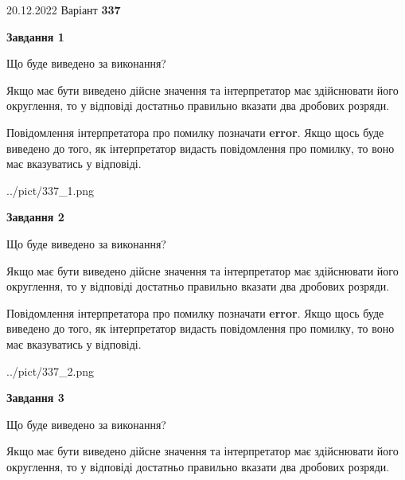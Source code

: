 \documentclass[12pt, ukrainian]{article}
\begin{document}
{20.12.2022 Варіант \No \textbf { 337 }\par}
{
\begin {Large}

{\begin {center}\textbf{Завдання 1}\end {center}}\par
Що буде виведено за виконання? \par

Якщо має бути виведено дійсне значення та інтерпретатор має здійснювати його округлення, 
то у відповіді достатньо правильно вказати два дробових розряди.

Повідомлення інтерпретатора про помилку позначати \textbf{error}.
Якщо щось буде виведено до того, як інтерпретатор видасть повідомлення про помилку, 
то воно має вказуватись у відповіді. \par

\begin{center}
	{../pict/337_1.png}
\end{center}
\newpage

{\begin {center}\textbf{Завдання 2}\end {center}}\par
Що буде виведено за виконання? \par

Якщо має бути виведено дійсне значення та інтерпретатор має здійснювати його округлення, 
то у відповіді достатньо правильно вказати два дробових розряди.

Повідомлення інтерпретатора про помилку позначати \textbf{error}.
Якщо щось буде виведено до того, як інтерпретатор видасть повідомлення про помилку, 
то воно має вказуватись у відповіді. \par

\begin{center}
	{../pict/337_2.png}
\end{center}
\newpage

{\begin {center}\textbf{Завдання 3}\end {center}}\par
Що буде виведено за виконання? \par

Якщо має бути виведено дійсне значення та інтерпретатор має здійснювати його округлення, 
то у відповіді достатньо правильно вказати два дробових розряди.


\end{Large}}
\end{document}
